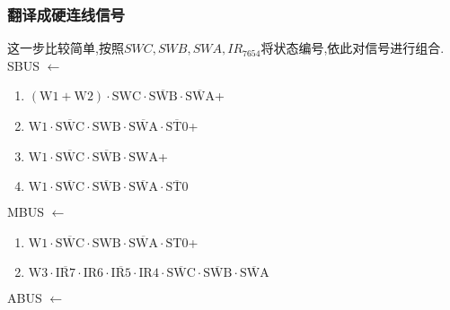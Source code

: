 \documentclass[UTF8]{ctexart}
\begin{document}
\subsubsection{翻译成硬连线信号}
这一步比较简单,按照$SWC, SWB, SWA, IR_{7654}$将状态编号,依此对信号进行组合.\\
\noindent SBUS $\leftarrow$
\begin{enumerate}[\indent\indent]
	\item $(\text{W1} + \text{W2}) \cdot \text{SWC} \cdot \overline{\text{SWB}} \cdot \overline{\text{SWA}}$+
	\item $\text{W1} \cdot \overline{\text{SWC}} \cdot \text{SWB} \cdot \overline{\text{SWA}} \cdot \overline {\text{ST0}}$+
	\item $\text{W1} \cdot \overline{\text{SWC}} \cdot\overline{\text{SWB}}\cdot  \text{SWA}$+
​	\item $\text{W1} \cdot \overline{\text{SWC}} \cdot\overline{\text{SWB}}\cdot \overline{\text{SWA}}\cdot \overline{\text{ST0}} $
\end{enumerate}
MBUS $\leftarrow$
\begin{enumerate}[\indent\indent]
	\item $\text{W1} \cdot \overline{\text{SWC}} \cdot \text{SWB} \cdot \overline{\text{SWA}} \cdot \text{ST0}$+
	\item $\text{W3} \cdot \overline{\text{IR7}} \cdot \text{IR6} \cdot \overline{\text{IR5}} \cdot \text{IR4} \cdot \overline{\text{SWC}} \cdot\overline{\text{SWB}}\cdot \overline{\text{SWA}}$
\end{enumerate}
ABUS $\leftarrow$
\end{document}
